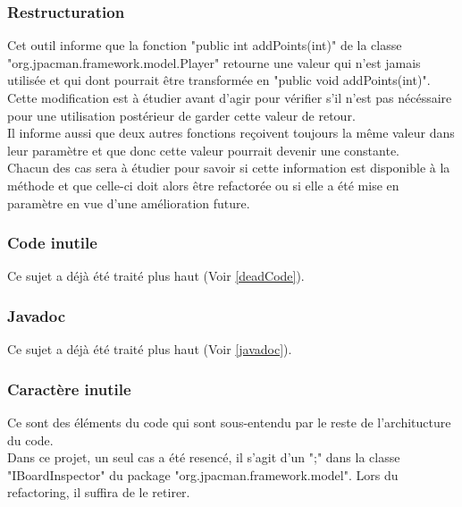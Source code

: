 \documentclass[12pt,a4paper,final]{article}
\begin{document}
\subsubsection{Restructuration}
Cet outil informe que la fonction "public int addPoints(int)" de la classe "org.jpacman.framework.model.Player" retourne une valeur qui n'est jamais utilisée et qui dont pourrait être transformée en "public void addPoints(int)".\\
Cette modification est à étudier avant d'agir pour vérifier s'il n'est pas nécéssaire pour une utilisation postérieur de garder cette valeur de retour.\\
Il informe aussi que deux autres fonctions reçoivent toujours la même valeur dans leur paramètre et que donc cette valeur pourrait devenir une constante.\\
Chacun des cas sera à étudier pour savoir si cette information est disponible à la méthode et que celle-ci doit alors être refactorée ou si elle a été mise en paramètre en vue d'une amélioration future.

\subsubsection{Code inutile}
Ce sujet a déjà été traité plus haut (Voir \ref{deadCode}).

\subsubsection{Javadoc}
Ce sujet a déjà été traité plus haut (Voir \ref{javadoc}).

\subsubsection{Caractère inutile}
Ce sont des éléments du code qui sont sous-entendu par le reste de l'architucture du code.\\
Dans ce projet, un seul cas a été resencé, il s'agit d'un ";" dans la classe "IBoardInspector" du package "org.jpacman.framework.model". Lors du refactoring, il suffira de le retirer.
\end{document}
